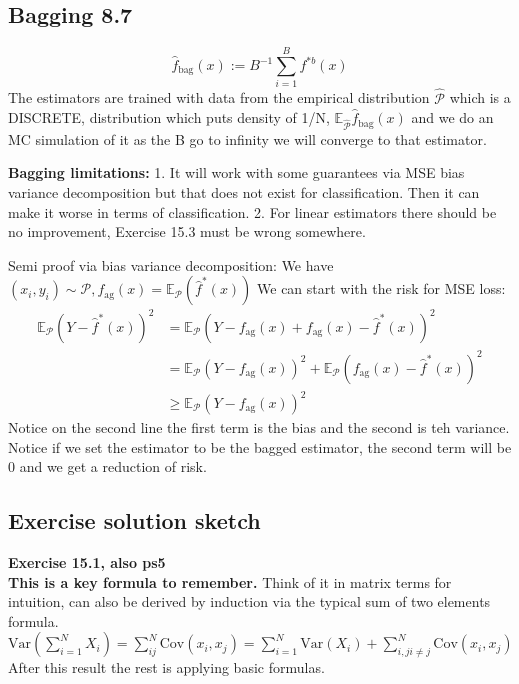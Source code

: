 \documentclass{article}
\begin{document}
\subsection*{Bagging 8.7}
$$\hat{f}_{\text{bag}}(x) := B^{-1} \sum_{i=1}^{B} f^{*b}(x)$$
The estimators are trained with data from the empirical distribution $\hat{\mathcal{P}}$ which is a DISCRETE, distribution which puts 
density of 1/N, $\mathbb{E}_{\hat{\mathcal{P}}}\hat{f}_{\text{bag}}(x) $ and we do an MC simulation of it as the B go to infinity we will converge to that estimator. 

\textbf{Bagging limitations:} 1. It will work with some guarantees via MSE bias variance decomposition but that does not exist for classification. 
Then it can make it worse in terms of classification. 2. For linear estimators there should be no improvement, Exercise 15.3 must be wrong somewhere. 

Semi proof via bias variance decomposition: We have $(x_i,y_i) \sim \mathcal{P}, f_{\text{ag}}(x) = \mathbb{E}_{\mathcal{P}}(\hat{f}^*(x)) $
We can start with the risk for MSE loss: 
\begin{align*}
    \mathbb{E}_{\mathcal{P}}(Y- \hat{f}^*(x))^2 &=  \mathbb{E}_{\mathcal{P}}(Y - f_{\text{ag}}(x) + f_{\text{ag}}(x) - \hat{f}^*(x))^2 \\
         & = \mathbb{E}_{\mathcal{P}}(Y - f_{\text{ag}}(x))^2 +\mathbb{E}_{\mathcal{P}}( f_{\text{ag}}(x) - \hat{f}^*(x))^2 \\
         &\geq \mathbb{E}_{\mathcal{P}}(Y - f_{\text{ag}}(x))^2
\end{align*}
Notice on the second line the first term is the bias and the second is teh variance. 
Notice if we set the estimator to be the bagged estimator, the second term will be 0 and we get a reduction of risk.      

\subsection*{Exercise solution sketch}
\textbf{Exercise 15.1, also ps5}\\
\textbf{This is a key formula to remember.} Think of it in matrix terms for intuition, can also be 
derived by induction via the typical sum of two elements formula.
\noindent
$\text{Var}(\sum_{i=1}^{N}X_i) = \sum_{ij}^{N} \text{Cov}(x_i, x_j) = \sum_{i=1}^{N}\text{Var}(X_i) + \sum_{i,j i\neq j}^{N}\text{Cov}(x_i,x_j)$
After this result the rest is applying basic formulas. 
\end{document}
